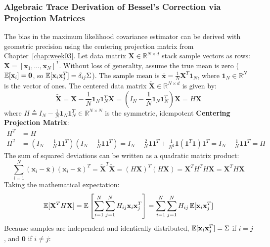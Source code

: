 \subsubsection{Algebraic Trace Derivation of Bessel's Correction via Projection Matrices}
The bias in the maximum likelihood covariance estimator can be derived with geometric precision using the centering projection matrix from Chapter~\ref{chap:week03}.
Let data matrix $\mathbf{X} \in \mathbb{R}^{N \times d}$ stack sample vectors as rows: $\mathbf{X} = [\mathbf{x}_1, \dots, \mathbf{x}_N]^T$.
Without loss of generality, assume the true mean is zero ($\operatorname{\mathbb{E}}[\mathbf{x}_i] = \mathbf{0}$, so $\operatorname{\mathbb{E}}[\mathbf{x}_i \mathbf{x}_j^T] = \delta_{ij}\Sigma$).
The sample mean is $\bar{\mathbf{x}} = \frac{1}{N}\mathbf{X}^T \mathbf{1}_N$, where $\mathbf{1}_N \in \mathbb{R}^N$ is the vector of ones.
The centered data matrix $\tilde{\mathbf{X}} \in \mathbb{R}^{N \times d}$ is given by:
\begin{equation}
\tilde{\mathbf{X}} = \mathbf{X} - \frac{1}{N}\mathbf{1}_N \mathbf{1}_N^T \mathbf{X} = \left( I_N - \frac{1}{N}\mathbf{1}_N \mathbf{1}_N^T \right) \mathbf{X} = H \mathbf{X}
\end{equation}
where $H \triangleq I_N - \frac{1}{N}\mathbf{1}_N \mathbf{1}_N^T \in \mathbb{R}^{N \times N}$ is the symmetric, idempotent \textbf{Centering Projection Matrix}:
\begin{align}
H^T &= H \\
H^2 &= \left(I_N - \frac{1}{N}\mathbf{1}\mathbf{1}^T\right)\left(I_N - \frac{1}{N}\mathbf{1}\mathbf{1}^T\right) = I_N - \frac{2}{N}\mathbf{1}\mathbf{1}^T + \frac{1}{N^2}\mathbf{1}(\mathbf{1}^T\mathbf{1})\mathbf{1}^T = I_N - \frac{1}{N}\mathbf{1}\mathbf{1}^T = H
\end{align}
The sum of squared deviations can be written as a quadratic matrix product:
\begin{equation}
\sum_{i=1}^N (\mathbf{x}_i - \bar{\mathbf{x}})(\mathbf{x}_i - \bar{\mathbf{x}})^T = \tilde{\mathbf{X}}^T \tilde{\mathbf{X}} = (H\mathbf{X})^T (H\mathbf{X}) = \mathbf{X}^T H^T H \mathbf{X} = \mathbf{X}^T H \mathbf{X}
\end{equation}
Taking the mathematical expectation:
\begin{equation}
\operatorname{\mathbb{E}}[\mathbf{X}^T H \mathbf{X}] = \operatorname{\mathbb{E}}\left[ \sum_{i=1}^N \sum_{j=1}^N H_{ij} \mathbf{x}_i \mathbf{x}_j^T \right] = \sum_{i=1}^N \sum_{j=1}^N H_{ij} \operatorname{\mathbb{E}}[\mathbf{x}_i \mathbf{x}_j^T]
\end{equation}
Because samples are independent and identically distributed, $\operatorname{\mathbb{E}}[\mathbf{x}_i \mathbf{x}_j^T] = \Sigma$ if $i = j$, and $\mathbf{0}$ if $i \ne j$:
